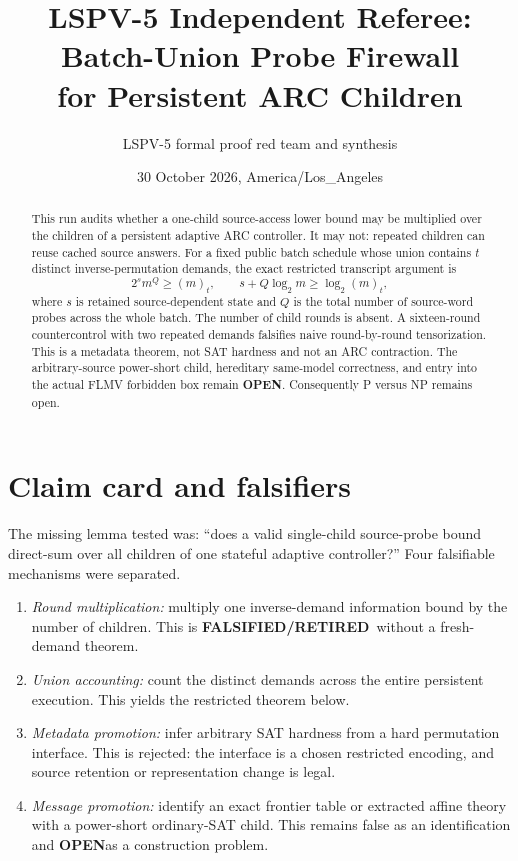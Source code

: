 \documentclass[11pt]{article}
\title{LSPV-5 Independent Referee: Batch-Union Probe Firewall\\
for Persistent ARC Children}
\author{LSPV-5 formal proof red team and synthesis}
\date{30 October 2026, America/Los\_Angeles}
\newcommand{\OPEN}{\textbf{OPEN}}
\newcommand{\RET}{\textbf{FALSIFIED/RETIRED}}
\begin{document}
\maketitle

\begin{abstract}
This run audits whether a one-child source-access lower bound may be multiplied
over the children of a persistent adaptive ARC controller.  It may not: repeated
children can reuse cached source answers.  For a fixed public batch schedule
whose union contains $t$ distinct inverse-permutation demands, the exact
restricted transcript argument is
\[
  2^s m^Q\ge (m)_t,
  \qquad s+Q\log_2m\ge\log_2 (m)_t,
\]
where $s$ is retained source-dependent state and $Q$ is the total number of
source-word probes across the whole batch.  The number of child rounds is absent.
A sixteen-round countercontrol with two repeated demands falsifies naive
round-by-round tensorization.  This is a metadata theorem, not SAT hardness and
not an ARC contraction.  The arbitrary-source power-short child, hereditary
same-model correctness, and entry into the actual FLMV forbidden box remain
\OPEN.  Consequently P versus NP remains open.
\end{abstract}

\section{Claim card and falsifiers}
The missing lemma tested was: ``does a valid single-child source-probe bound
direct-sum over all children of one stateful adaptive controller?''  Four
falsifiable mechanisms were separated.
\begin{enumerate}
\item \emph{Round multiplication:} multiply one inverse-demand information
bound by the number of children.  This is \RET\ without a fresh-demand theorem.
\item \emph{Union accounting:} count the distinct demands across the entire
persistent execution.  This yields the restricted theorem below.
\item \emph{Metadata promotion:} infer arbitrary SAT hardness from a hard
permutation interface.  This is rejected: the interface is a chosen restricted
encoding, and source retention or representation change is legal.
\item \emph{Message promotion:} identify an exact frontier table or extracted
affine theory with a power-short ordinary-SAT child.  This remains false as an
identification and \OPEN as a construction problem.
\end{enumerate}
\end{document}
